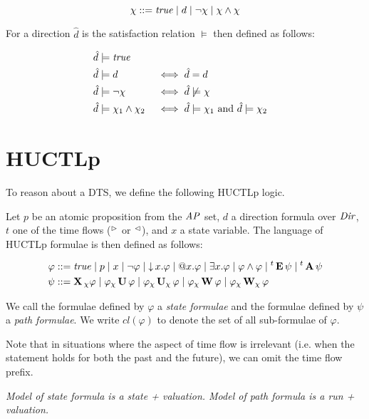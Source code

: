 \[
	\chi ::= \mathit{true} \mid d \mid \neg\chi \mid \chi\wedge\chi
\]

For a direction $\hat d$ is the satisfaction relation $\models$ then defined as follows:

\begin{alignat*}{4}
	\hat d &\models \mathit{true} \\
	\hat d &\models d 								&&\iff \hat d = d \\
	\hat d &\models \neg\chi 					 &&\iff \hat d\not\models\chi \\
	\hat d &\models \chi_1 \land \chi_2 	 &&\iff \hat d\models\chi_1 \text{ and } \hat d\models\chi_2
\end{alignat*}

\section{\Acl{HUCTLp}}

To reason about a \ac{DTS}, we define the following \ac{HUCTLp} logic.

Let $p$ be an atomic proposition from the $\mathit{AP}$ set, $d$ a direction formula over $\mathit{Dir}$,  $t$ one of the time flows (${}^\vartriangleright{}$ or ${}^\vartriangleleft{}$), and $x$ a state variable. The language of \ac{HUCTLp} formulae is then defined as follows:

\begin{align*}
	\varphi 	&::= 	\mathit{true} 
	\mid p 
	\mid x 
	\mid  \neg \varphi 
	\mid \operatorname{\downarrow} x. \varphi 
	\mid \operatorname{@\!} x. \varphi 
	\mid \exists x. \varphi 
	\mid \varphi \land \varphi 
	\mid {}^{t}\operatorname{\mathbf{E}} \psi 
	\mid {}^{t}\operatorname{\mathbf{A}} \psi 
	\\
	\psi 		  &::= 	  
	\operatorname{\mathbf{X}}{}_{\chi} \varphi \mid
	\varphi {}_{\chi}\operatorname{\mathbf{U}} \varphi \mid
	\varphi {}_{\chi}\operatorname{\mathbf{U}}_{\chi} \varphi \mid
	\varphi {}_{\chi}\operatorname{\mathbf{W}} \varphi \mid
	\varphi {}_{\chi}\operatorname{\mathbf{W}}_{\chi} \varphi
	\\
\end{align*}

We call the formulae defined by $\varphi$ a \emph{state formulae} and the formulae defined by $\psi$ a \emph{path formulae}. We write $cl(\varphi)$ to denote the set of all sub-formulae of $\varphi$.

Note that in situations where the aspect of time flow is irrelevant (i.e. when the statement holds for both the past and the future), we can omit the time flow prefix.

\emph{Model of state formula is a state + valuation. Model of path formula is a run + valuation.}

